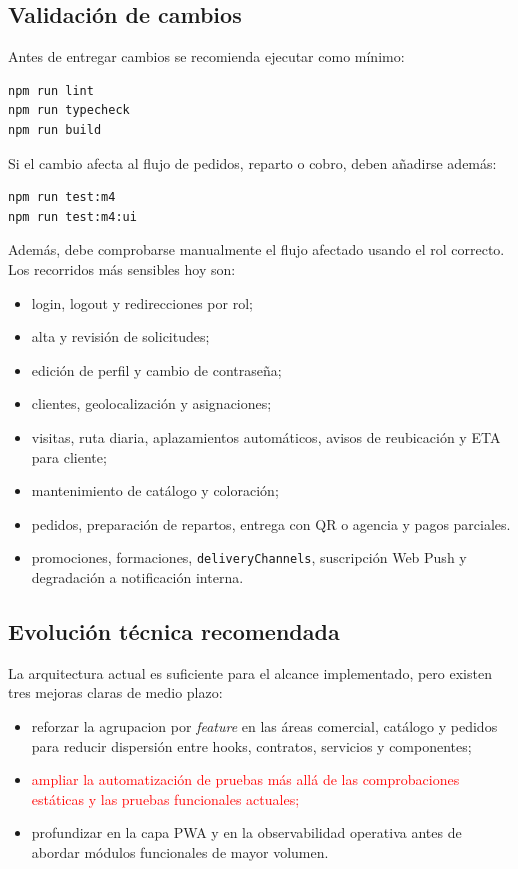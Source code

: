 \subsection{Validación de cambios}

Antes de entregar cambios se recomienda ejecutar como mínimo:

\begin{lstlisting}[language=bash]
npm run lint
npm run typecheck
npm run build
\end{lstlisting}

Si el cambio afecta al flujo de pedidos, reparto o cobro, deben añadirse además:

\begin{lstlisting}[language=bash]
npm run test:m4
npm run test:m4:ui
\end{lstlisting}

Además, debe comprobarse manualmente el flujo afectado usando el rol correcto. Los recorridos más sensibles hoy son:

\begin{itemize}
    \item login, logout y redirecciones por rol;
    \item alta y revisión de solicitudes;
    \item edición de perfil y cambio de contraseña;
    \item clientes, geolocalización y asignaciones;
    \item visitas, ruta diaria, aplazamientos automáticos, avisos de reubicación y ETA para cliente;
    \item mantenimiento de catálogo y coloración;
    \item pedidos, preparación de repartos, entrega con QR o agencia y pagos parciales.
    \item promociones, formaciones, \texttt{deliveryChannels}, suscripción Web Push y degradación a notificación interna.
\end{itemize}

\subsection{Evolución técnica recomendada}

La arquitectura actual es suficiente para el alcance implementado, pero existen tres mejoras claras de medio plazo:

\begin{itemize}
    \item reforzar la agrupacion por \textit{feature} en las áreas comercial, catálogo y pedidos para reducir dispersión entre hooks, contratos, servicios y componentes;
    \item \textcolor{red}{ampliar la automatización de pruebas más allá de las comprobaciones estáticas y las pruebas funcionales actuales;}
    \item profundizar en la capa PWA y en la observabilidad operativa antes de abordar módulos funcionales de mayor volumen.
\end{itemize}

